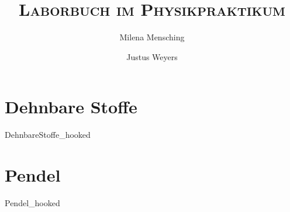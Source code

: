 

\title{\textsc{Laborbuch im Physikpraktikum}}
\author{Milena Mensching \and Justus Weyers}


	\maketitle
	\newpage	
    \tableofcontents
    \newpage
    
    \part{Dehnbare Stoffe}
	{DehnbareStoffe_hooked}
	
	\part{Pendel}
	{Pendel_hooked}
	
	\newpage
    
    
	\newpage
	\listoffigures
	\listoftables


